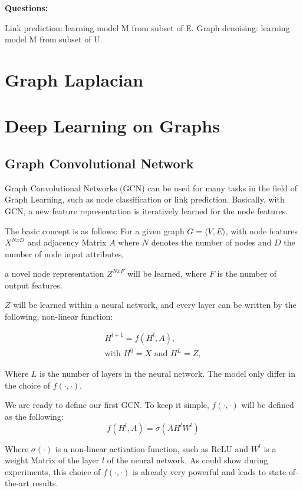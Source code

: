 \textbf{Questions:}

Link prediction: learning model M from subset of E.
Graph denoising: learning model M from subset of U.


\section{Graph Laplacian}

\section{Deep Learning on Graphs}

\subsection{Graph Convolutional Network}
Graph Convolutional Networks (GCN) \cite{GCN} can be used for many tasks in the field 
of Graph Learning, such as node classification or link prediction. 
Basically, with GCN, a new feature representation is iteratively learned for the node features.

The basic concept is as follows:
For a given graph $G = \langle V,E \rangle$, with node features $X^{N x D}$ and adjacency Matrix $A$
where $N$ denotes the number of nodes and $D$ the number of node input attributes,

a novel node representation $Z^{N x F}$ will be learned, where $F$ is the number of output features.

$Z$ will be learned within a neural network, and every layer can be written by the following, non-linear function:

\begin{equation}
    \begin{aligned}
        H^{l + 1} = f( H^l, A), \\
        \text{with } H^0 = X \text{ and } H^L = Z, 
    \end{aligned}
\end{equation}

Where $L$ is the number of layers in the neural network.
The model only differ in the choice of $f(\cdot,\cdot)$.

We are ready to define our first GCN. To keep it simple, $f(\cdot,\cdot)$ will be defined as the following:
\begin{equation}
    f( H^l, A) = \sigma (A H^l W^l)
\end{equation} 

Where $\sigma ( \cdot )$ is a non-linear activation function, such as ReLU and $W^l$ is
a weight Matrix of the layer $l$ of the neural network. As \cite{GCN} could show during experiments,
this choice of $f(\cdot,\cdot)$ is already very powerful and leads to state-of-the-art results.


